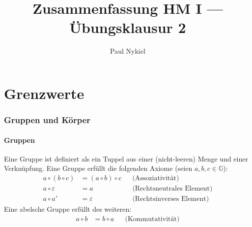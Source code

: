 \documentclass[10pt]{article}
\title{Zusammenfassung HM I --- Übungsklausur 2}
\author{Paul Nykiel}
\begin{document}
    \maketitle
    \pagebreak
    \tableofcontents
    \pagebreak

    \part{Grenzwerte}
    \section{Gruppen und Körper}
    \subsection{Gruppen}
    Eine Gruppe ist definiert als ein Tuppel aus einer (nicht-leeren) Menge
    und einer Verknüpfung.
    Eine Gruppe erfüllt die folgenden Axiome (seien $a,b,c \in \mathbb{G}$):
    \begin{align*}
        a \circ (b \circ c) &= (a \circ b) \circ c &&\text{(Assoziativität)}\\
        a \circ \varepsilon &= a &&\text{(Rechtsneutrales Element)}\\
        a \circ a' &= \varepsilon  &&\text{(Rechtsinverses Element)}
    \end{align*}
    Eine abelsche Gruppe erfüllt des weiteren:
    \begin{align*}
        a \circ b &= b \circ a  &&\text{(Kommutativität)}
    \end{align*}
\end{document}
